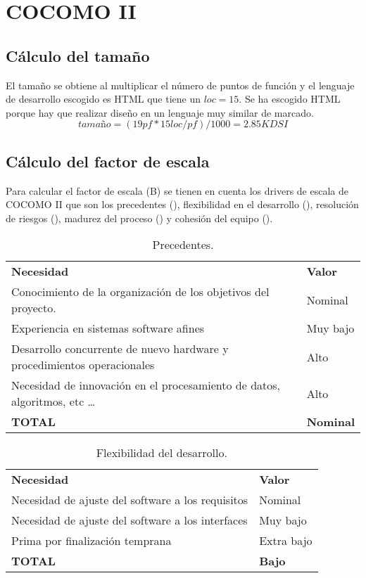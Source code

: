 \section{COCOMO II}
\subsection{Cálculo del tamaño}
\par El tamaño se obtiene al multiplicar el número de puntos de función y el lenguaje de desarrollo escogido es HTML que tiene un $loc=15$. Se ha escogido HTML porque hay que realizar diseño en un lenguaje muy similar de marcado.
$$ tamaño = (19pf * 15loc/pf)/1000 = 2.85KDSI $$


\subsection{Cálculo del factor de escala}
\par Para calcular el factor de escala (B) se tienen en cuenta los drivers de escala de COCOMO II que son los precedentes (\label{tab:precedentes}), flexibilidad en el desarrollo (\label{tab:flexibilidad}), resolución de riesgos (\label{tab:riesgos}), madurez del proceso (\label{tab:madurez}) y cohesión del equipo (\label{tab:cohesion}).

\begin{table}[h]
\begin{center}
\begin{tabular}{ l l }
\textbf{Necesidad} & \textbf{Valor} \\
Conocimiento de la organización de los objetivos del proyecto. & Nominal \\
Experiencia en sistemas software afines & Muy bajo \\
Desarrollo concurrente de nuevo hardware y procedimientos operacionales & Alto \\
Necesidad de innovación en el procesamiento de datos, algoritmos, etc … & Alto \\
\textbf{TOTAL} & \textbf{Nominal} \\
\end{tabular}
\caption{Precedentes.}
\label{tab:precedentes}
\end{center}
\end{table}

\begin{table}[h]
\begin{center}
\begin{tabular}{ l l }
\textbf{Necesidad} & \textbf{Valor} \\
Necesidad de ajuste del software a los requisitos &
Nominal\\
Necesidad de ajuste del software a los interfaces &
Muy bajo\\
Prima por finalización temprana &
Extra bajo\\
\textbf{TOTAL} & \textbf{Bajo} \\
\end{tabular}
\caption{Flexibilidad del desarrollo.}
\label{tab:flexibilidad}
\end{center}
\end{table}

